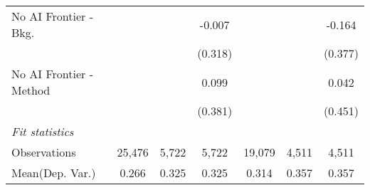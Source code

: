 \begin{tabular}{lcccccc}
   No AI Frontier - Bkg.   &              &         & -0.007  &              &         & -0.164\\   
                           &              &         & (0.318) &              &         & (0.377)\\   
   No AI Frontier - Method &              &         & 0.099   &              &         & 0.042\\   
                           &              &         & (0.381) &              &         & (0.451)\\   
   \midrule
   \emph{Fit statistics}\\
   Observations            & 25,476       & 5,722   & 5,722   & 19,079       & 4,511   & 4,511\\  
Mean(Dep. Var.) & 0.266 & 0.325 & 0.325 & 0.314 & 0.357 & 0.357 \\
   

\end{tabular}
